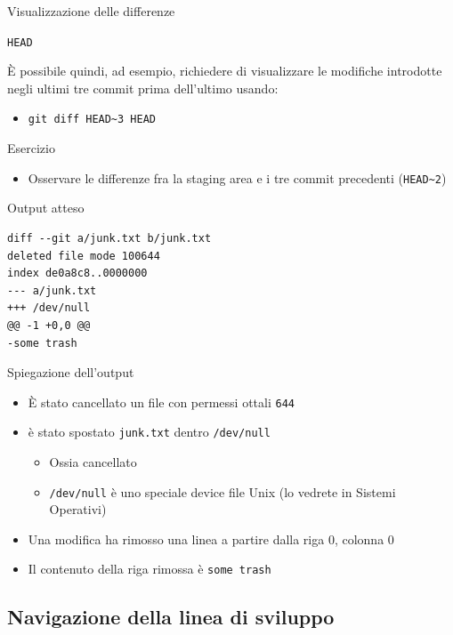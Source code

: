 \documentclass[presentation]{beamer}
\begin{document}
\begin{frame}{Visualizzazione delle differenze}
\begin{block}{\texttt{HEAD}}
\begin{itemize}
		\end{itemize}
		È possibile quindi, ad esempio, richiedere di visualizzare le modifiche introdotte negli ultimi tre commit prima dell'ultimo usando:
		\begin{itemize}
			\item \texttt{git diff HEAD\textasciitilde{}3 HEAD}
		\end{itemize}
	\end{block}
	\begin{block}{Esercizio}	
		\begin{itemize}
			\item Osservare le differenze fra la staging area e i tre commit precedenti (\texttt{HEAD\textasciitilde{}2})
		\end{itemize}
	\end{block}
	\begin{block}{Output atteso}
		\begin{Verbatim}[fontsize=\scriptsize]
diff --git a/junk.txt b/junk.txt
deleted file mode 100644
index de0a8c8..0000000
--- a/junk.txt
+++ /dev/null
@@ -1 +0,0 @@
-some trash
		\end{Verbatim}
	\end{block}
		\begin{block}{Spiegazione dell'output}
		\begin{itemize}
			\item È stato cancellato un file con permessi ottali \texttt{644}
			\item è stato spostato \texttt{junk.txt} dentro \texttt{/dev/null}
			\begin{itemize}
				\item Ossia cancellato
				\item \texttt{/dev/null} è uno speciale device file Unix (lo vedrete in Sistemi Operativi)
			\end{itemize}
			\item Una modifica ha rimosso una linea a partire dalla riga 0, colonna 0
			\item Il contenuto della riga rimossa è \texttt{some trash}
		\end{itemize}
	\end{block}
\end{frame}

\subsection{Navigazione della linea di sviluppo}
\end{document}
